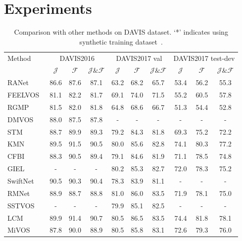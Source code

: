 \documentclass[runningheads]{llncs}
\begin{document}
 \section{Experiments}
\begin{table*}[t]
\centering
		\caption{Comparison with other methods on DAVIS dataset. `*' indicates using synthetic training dataset~\cite{mivos}.}
\label{tab:results}
		\setlength\tabcolsep{4pt}
		\begin{tabular}{lccccccccc}
			\toprule[1.5pt]
			\multirow{2}{*}{Method} & \multicolumn{3}{c}{DAVIS2016} & \multicolumn{3}{c}{DAVIS2017 val} & \multicolumn{3}{c}{DAVIS2017 test-dev} \\
			\cmidrule(lr){2-4} \cmidrule(lr){5-7} \cmidrule(lr){8-10}
			& $\mathcal{J}$ & $\mathcal{F}$ & $\mathcal{J}\&\mathcal{F}$ & $\mathcal{J}$ & $\mathcal{F}$ & $\mathcal{J}\&\mathcal{F}$& $\mathcal{J}$ &$\mathcal{F}$ & $\mathcal{J}\&\mathcal{F}$ \\
			\midrule
RANet~\cite{ranet}   & 86.6 & 87.6 & 87.1 & 63.2  & 68.2 & 65.7 & 53.4    & 56.2    & 55.3 \\
			FEELVOS~\cite{feelvos}  & 81.1 & 82.2 & 81.7 & 69.1   & 74.0   & 71.5 & 55.2    & 60.5    & 57.8\\
			RGMP~\cite{rgmp}      & 81.5   & 82.0 & 81.8 &64.8 &68.6 &66.7 &51.3 &54.4 &52.8\\
			DMVOS~\cite{dmvos}   & 88.0  & 87.5  & 87.8 &- &- &- &- &- &-\\
			STM~\cite{stm}       & 88.7  & 89.9  & 89.3 & 79.2   & 84.3   & 81.8 & 69.3    & 75.2    & 72.2\\
			KMN~\cite{kmn}       & 89.5  & 91.5 & 90.5 & 80.0    & 85.6    & 82.8 & 74.1    & 80.3    & 77.2\\
			CFBI~\cite{cfbi}     & 88.3  & 90.5  & 89.4 & 79.1    & 84.6    & 81.9 & 71.1    & 78.5    & 74.8\\
GIEL~\cite{giel}     &- &- &- & 80.2    & 85.3    & 82.7 & 72.0    & 78.3    & 75.2\\
			SwiftNet~\cite{swiftnet} & 90.5  & 90.3  & 90.4 & 78.3    & 83.9    & 81.1 &- &- &-\\
			RMNet~\cite{rmnet}   & 88.9  & 88.7 & 88.8 & 81.0    & 86.0    & 83.5 & 71.9    & 78.1    & 75.0\\
			SSTVOS~\cite{sstvos}     &- &- &-  & 79.9  & 85.1  & 82.5   &- &- &- \\ 
			LCM~\cite{lcm}       & 89.9  & 91.4  & 90.7 & 80.5    & 86.5    & 83.5 & 74.4    & 81.8    & 78.1\\
			MiVOS~\cite{mivos}   & {87.8}   & {90.0}  & {88.9} & {80.5}    & {85.8}    & {83.1} &{72.6}    & {79.3}    & {76.0}\\

\end{tabular}
\end{table*}
\end{document}
